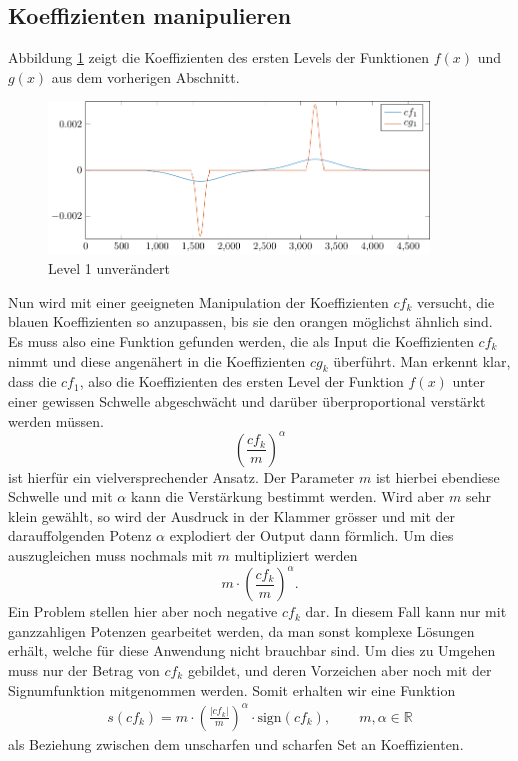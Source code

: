 \subsection{Koeffizienten manipulieren}
Abbildung \ref{deconvolve:level1} zeigt die Koeffizienten des ersten Levels der Funktionen $f(x)$ und $g(x)$ aus dem vorherigen Abschnitt.
\begin{figure}[h]
\centering
\includegraphics[width=0.9\textwidth]{./papers/deconvolve/pictures/level/level1.pdf}
\caption{Level 1 unverändert\label{deconvolve:level1}}
\end{figure}

Nun wird mit einer geeigneten Manipulation der Koeffizienten $cf_k$ versucht, die blauen Koeffizienten so anzupassen, bis sie den orangen möglichst ähnlich sind.
Es muss also eine Funktion gefunden werden, die als Input die Koeffizienten $cf_k$ nimmt und diese angenähert in die Koeffizienten $cg_k$ überführt.
Man erkennt klar, dass die $cf_1$, also die Koeffizienten des ersten Level der Funktion $f(x)$ unter einer gewissen Schwelle abgeschwächt und darüber überproportional verstärkt werden müssen.
$$\left( \frac{cf_k}{m}\right)^\alpha$$
ist hierfür ein vielversprechender Ansatz.
Der Parameter $m$ ist hierbei ebendiese Schwelle und mit $\alpha$ kann die Verstärkung bestimmt werden.
Wird aber $m$ sehr klein gewählt, so wird der Ausdruck in der Klammer grösser und mit der darauffolgenden Potenz $\alpha$ explodiert der Output dann förmlich.
Um dies auszugleichen muss nochmals mit $m$ multipliziert werden
$$m\cdot \left( \frac{cf_k}{m}\right)^\alpha.$$
Ein Problem stellen hier aber noch negative $cf_k$ dar. In diesem Fall kann nur mit ganzzahligen Potenzen gearbeitet werden, da man sonst komplexe Lösungen erhält, welche für diese Anwendung nicht brauchbar sind.
Um dies zu Umgehen muss nur der Betrag von $cf_k$ gebildet, und deren Vorzeichen aber noch mit der Signumfunktion mitgenommen werden.
Somit erhalten wir eine Funktion
\begin{align}
s(cf_k)=m\cdot \left(\frac{|cf_k|}{m}\right)^{\alpha}\cdot \text{sign}(cf_k), \qquad m,\alpha\in\mathbb{R}
\label{deconvolve:funktion}
\end{align}
als Beziehung zwischen dem \glqq unscharfen\grqq{} und \glqq scharfen\grqq{} Set an Koeffizienten.


